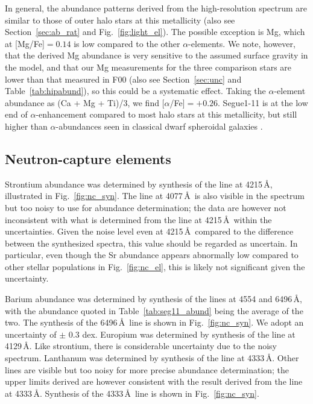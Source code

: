\documentclass[manuscript]{aastex}
\begin{document}
In general, the abundance patterns derived from the high-resolution spectrum are similar to those of outer halo stars at this metallicity (also see Section~\ref{sec:ab_rat} and  Fig.~\ref{fig:light_el}). The possible exception is Mg, which at [Mg/Fe]$=0.14$ is low compared to the other $\alpha$-elements. We note, however, that the derived Mg abundance is very sensitive to the assumed surface gravity in the model, and that our Mg measurements for the three comparison stars are lower than that measured in F00 (also see Section~\ref{sec:unc} and Table~\ref{tab:hipabund}), so this could be a systematic effect. Taking the $\alpha$-element abundance as (Ca + Mg + Ti)/3, we find [$\alpha$/Fe]$= +0.26 $. Segue1-11 is at the low end of $\alpha$-enhancement compared to most halo stars at this metallicity, but still higher than $\alpha$-abundances seen in classical dwarf spheroidal galaxies \citep[e.g.][]{Tolstoy2009}.



\subsection{Neutron-capture elements}

Strontium abundance was determined by synthesis of the line at 4215\,\AA, illustrated in Fig.~\ref{fig:nc_syn}. The line at 4077\,\AA\, is also visible in the spectrum but too noisy to use for abundance determination; the data are however not inconsistent with what is determined from the line at 4215\,\AA\, within the uncertainties. Given the noise level even at 4215\,\AA\, compared to the difference between the synthesized spectra, this value should be regarded as uncertain. In particular, even though the Sr abundance appears abnormally low compared to other stellar populations in Fig.~\ref{fig:nc_el}, this is likely not significant given the uncertainty.

Barium abundance was determined by synthesis of the lines at 4554 and 6496\,\AA, with the abundance quoted in Table~\ref{tab:seg11_abund} being the average of the two. The synthesis of the 6496\,\AA\,  line is shown in Fig.~\ref{fig:nc_syn}. We adopt an uncertainty of $\pm$ 0.3 dex. Europium was determined by synthesis of the line at 4129\,\AA. Like strontium, there is considerable uncertainty due to the noisy spectrum. Lanthanum was determined by synthesis of the line at 4333\,\AA. Other lines are visible but too noisy for more precise abundance determination; the upper limits derived are however consistent with the result derived from the line at 4333\,\AA. Synthesis of the 4333\,\AA\, line is shown in Fig.~\ref{fig:nc_syn}. 
\end{document}
